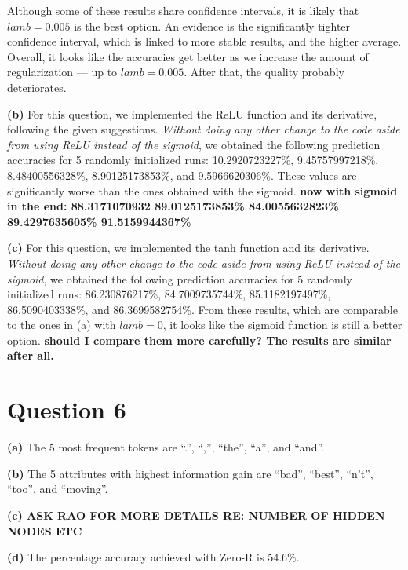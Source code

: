 \documentclass[leqno]{article}
\begin{document}
Although some of these results share confidence intervals, it is likely that $lamb = 0.005$ is the best option. An evidence is the significantly 
tighter confidence interval, which is linked to more stable results, and the higher average. 
 Overall, it looks like the accuracies get better as we increase the amount of regularization --- up to $lamb = 0.005$.
After that, the quality probably deteriorates. %

\hfill 

\noindent \textbf{(b)} For this question, we implemented the ReLU function and its derivative, following the given suggestions. \textit{Without doing any other change to 
the code aside from using ReLU instead of the sigmoid}, we obtained the following prediction accuracies for 5 randomly initialized runs: 
10.2920723227\%, 9.45757997218\%, 8.48400556328\%, 8.90125173853\%, and 9.5966620306\%. These values are significantly worse than the ones obtained with the 
sigmoid. \textbf{now with sigmoid in the end: 88.3171070932 89.0125173853\% 84.0055632823\% 89.4297635605\% 91.5159944367\%} %

\hfill

\noindent \textbf{(c)} For this question, we implemented the tanh function and its derivative. \textit{Without doing any other change to 
the code aside from using ReLU instead of the sigmoid}, we obtained the following prediction accuracies for 5 randomly initialized runs:
86.230876217\%, 84.7009735744\%, 85.1182197497\%, 86.5090403338\%, and 86.3699582754\%. From these results, which are comparable to the 
ones in (a) with $lamb = 0$, it looks like the sigmoid function is still a better option. \textbf{should I compare them more carefully? 
The results are similar after all.} 

\hfill

\section*{Question 6} \textbf{(a)} The 5 most frequent tokens are ``.'', ``,'', ``the'', ``a'', and 
``and''.

\hfill

\noindent \textbf{(b)} The 5 attributes with highest information gain are ``bad'', ``best'', ``n't'', ``too'', and ``moving''. 

\hfill

\noindent \textbf{(c) ASK RAO FOR MORE DETAILS RE: NUMBER OF HIDDEN NODES ETC}

\hfill

\noindent \textbf{(d)} The percentage accuracy achieved with Zero-R is 54.6\%. 
\end{document}
